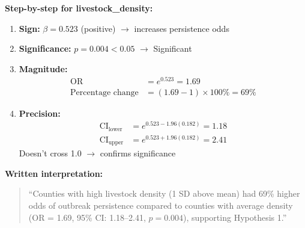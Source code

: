 \documentclass[11pt,a4paper]{article}
\begin{document}
\textbf{Step-by-step for livestock\_density:}

\begin{enumerate}
    \item \textbf{Sign:} $\beta = 0.523$ (positive) $\rightarrow$ increases persistence odds
    
    \item \textbf{Significance:} $p = 0.004 < 0.05$ $\rightarrow$ \checkmark Significant
    
    \item \textbf{Magnitude:}
    \begin{align*}
        \text{OR} &= e^{0.523} = 1.69 \\
        \text{Percentage change} &= (1.69 - 1) \times 100\% = 69\%
    \end{align*}
    
    \item \textbf{Precision:}
    \begin{align*}
        \text{CI}_{\text{lower}} &= e^{0.523 - 1.96(0.182)} = 1.18 \\
        \text{CI}_{\text{upper}} &= e^{0.523 + 1.96(0.182)} = 2.41
    \end{align*}
    Doesn't cross 1.0 $\rightarrow$ confirms significance
\end{enumerate}

\textbf{Written interpretation:}
\begin{quote}
``Counties with high livestock density (1 SD above mean) had 69\% higher odds of outbreak persistence compared to counties with average density (OR = 1.69, 95\% CI: 1.18--2.41, $p = 0.004$), supporting Hypothesis 1.''
\end{quote}
\end{document}
